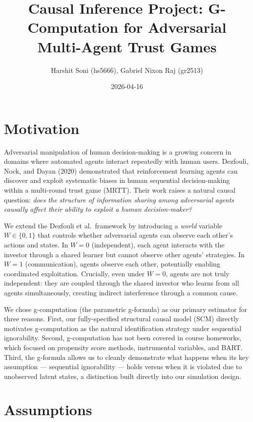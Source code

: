 \documentclass[
]{article}
\title{Causal Inference Project: G-Computation for Adversarial
Multi-Agent Trust Games}
\author{Harshit Soni (hs5666), Gabriel Nixon Raj (gr2513)}
\date{2026-04-16}
\begin{document}
\maketitle

{
\setcounter{tocdepth}{3}
\tableofcontents
}
\section{Motivation}\label{motivation}

Adversarial manipulation of human decision-making is a growing concern
in domains where automated agents interact repeatedly with human users.
Dezfouli, Nock, and Dayan (2020) demonstrated that reinforcement
learning agents can discover and exploit systematic biases in human
sequential decision-making within a multi-round trust game (MRTT). Their
work raises a natural causal question: \emph{does the structure of
information sharing among adversarial agents causally affect their
ability to exploit a human decision-maker?}

We extend the Dezfouli et al.~framework by introducing a \emph{world}
variable \(W \in \{0, 1\}\) that controls whether adversarial agents can
observe each other's actions and states. In \(W = 0\) (independent),
each agent interacts with the investor through a shared learner but
cannot observe other agents' strategies. In \(W = 1\) (communication),
agents observe each other, potentially enabling coordinated
exploitation. Crucially, even under \(W = 0\), agents are not truly
independent: they are coupled through the shared investor who learns
from all agents simultaneously, creating indirect interference through a
common cause.

We chose g-computation (the parametric g-formula) as our primary
estimator for three reasons. First, our fully-specified structural
causal model (SCM) directly motivates g-computation as the natural
identification strategy under sequential ignorability. Second,
g-computation has not been covered in course homeworks, which focused on
propensity score methods, instrumental variables, and BART. Third, the
g-formula allows us to cleanly demonstrate what happens when its key
assumption --- sequential ignorability --- holds versus when it is
violated due to unobserved latent states, a distinction built directly
into our simulation design.

\section{Assumptions}\label{assumptions}
\end{document}
